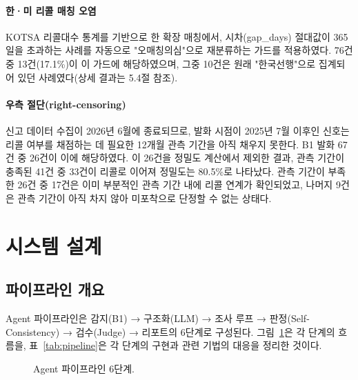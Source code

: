\documentclass[11pt]{article}
\begin{document}
\paragraph{한·미 리콜 매칭 오염} KOTSA 리콜대수 통계를 기반으로 한 확장 매칭에서, 시차(gap\_days) 절대값이 365일을 초과하는 사례를 자동으로 "오매칭의심"으로 재분류하는 가드를 적용하였다. 76건 중 13건(17.1\%)이 이 가드에 해당하였으며, 그중 10건은 원래 "한국선행"으로 집계되어 있던 사례였다(상세 결과는 5.4절 참조).

\paragraph{우측 절단(right-censoring)} 신고 데이터 수집이 2026년 6월에 종료되므로, 발화 시점이 2025년 7월 이후인 신호는 리콜 여부를 채점하는 데 필요한 12개월 관측 기간을 아직 채우지 못한다. B1 발화 67건 중 26건이 이에 해당하였다. 이 26건을 정밀도 계산에서 제외한 결과, 관측 기간이 충족된 41건 중 33건이 리콜로 이어져 정밀도는 80.5\%로 나타났다. 관측 기간이 부족한 26건 중 17건은 이미 부분적인 관측 기간 내에 리콜 연계가 확인되었고, 나머지 9건은 관측 기간이 아직 차지 않아 미포착으로 단정할 수 없는 상태다.

\section{시스템 설계}

\subsection{파이프라인 개요}

Agent 파이프라인은 감지(B1) → 구조화(LLM) → 조사 루프 → 판정(Self-Consistency) → 검수(Judge) → 리포트의 6단계로 구성된다. 그림~\ref{fig:pipeline}은 각 단계의 흐름을, 표~\ref{tab:pipeline}은 각 단계의 구현과 관련 기법의 대응을 정리한 것이다.

\begin{figure}[H]
\centering
{}
\caption{Agent 파이프라인 6단계.}
\label{fig:pipeline}
\end{figure}
\end{document}
